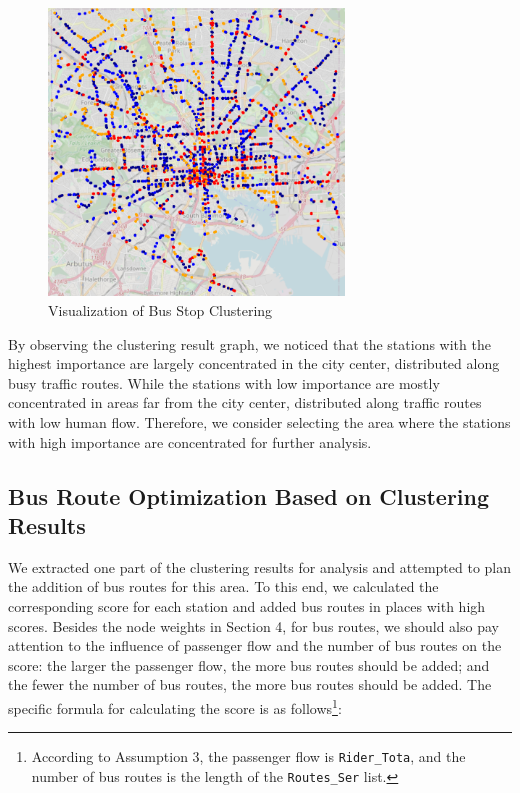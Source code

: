 \documentclass{mcmthesis}
\begin{document}
\begin{figure}[H]
  \centering
  \includegraphics[width=0.7\textwidth]{figures/cluster.png}
  \caption{Visualization of Bus Stop Clustering}
  \label{fig:cluster}
\end{figure}

By observing the clustering result graph, we noticed that the stations with the highest importance are largely concentrated in the city center, distributed along busy traffic routes. While the stations with low importance are mostly concentrated in areas far from the city center, distributed along traffic routes with low human flow. Therefore, we consider selecting the area where the stations with high importance are concentrated for further analysis.

\subsection{Bus Route Optimization Based on Clustering Results}

We extracted one part of the clustering results for analysis and attempted to plan the addition of bus routes for this area. To this end, we calculated the corresponding score for each station and added bus routes in places with high scores. Besides the node weights in Section 4, for bus routes, we should also pay attention to the influence of passenger flow and the number of bus routes on the score: the larger the passenger flow, the more bus routes should be added; and the fewer the number of bus routes, the more bus routes should be added. The specific formula for calculating the score is as follows\footnote{According to Assumption 3, the passenger flow is \texttt{Rider\_Tota}, and the number of bus routes is the length of the \texttt{Routes\_Ser} list.}:
\end{document}
